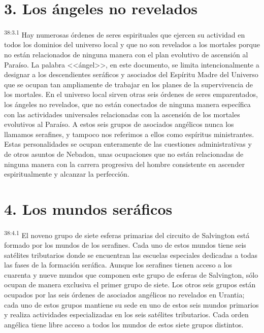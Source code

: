 \section*{3. Los ángeles no revelados}
\par
\textsuperscript{38:3.1} Hay numerosas órdenes de seres espirituales que ejercen su actividad en todos los dominios del universo local y que no son revelados a los mortales porque no están relacionados de ninguna manera con el plan evolutivo de ascensión al Paraíso. La palabra <<ángel>>, en este documento, se limita intencionalmente a designar a los descendientes seráficos y asociados del Espíritu Madre del Universo que se ocupan tan ampliamente de trabajar en los planes de la supervivencia de los mortales. En el universo local sirven otras seis órdenes de seres emparentados, los ángeles no revelados, que no están conectados de ninguna manera específica con las actividades universales relacionadas con la ascensión de los mortales evolutivos al Paraíso. A estos seis grupos de asociados angélicos nunca los llamamos serafines, y tampoco nos referimos a ellos como espíritus ministrantes. Estas personalidades se ocupan enteramente de las cuestiones administrativas y de otros asuntos de Nebadon, unas ocupaciones que no están relacionadas de ninguna manera con la carrera progresiva del hombre consistente en ascender espiritualmente y alcanzar la perfección.

\section*{4. Los mundos seráficos}
\par
\textsuperscript{38:4.1} El noveno grupo de siete esferas primarias del circuito de Salvington está formado por los mundos de los serafines. Cada uno de estos mundos tiene seis satélites tributarios donde se encuentran las escuelas especiales dedicadas a todas las fases de la formación seráfica. Aunque los serafines tienen acceso a los cuarenta y nueve mundos que componen este grupo de esferas de Salvington, sólo ocupan de manera exclusiva el primer grupo de siete. Los otros seis grupos están ocupados por las seis órdenes de asociados angélicos no revelados en Urantia; cada uno de estos grupos mantiene su sede en uno de estos seis mundos primarios y realiza actividades especializadas en los seis satélites tributarios. Cada orden angélica tiene libre acceso a todos los mundos de estos siete grupos distintos.

